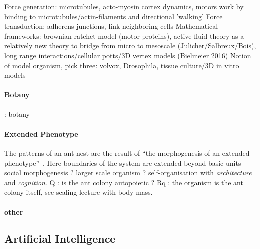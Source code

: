 \documentclass[fleqn,10pt]{wlscirep}
\begin{document}
Force generation: microtubules, acto-myosin cortex dynamics, motors work by binding to microtubules/actin-filaments and directional 'walking'
Force transduction: adherens junctions, link neighboring cells
Mathematical frameworks: brownian ratchet model (motor proteins), active fluid theory as a relatively new theory to bridge from micro to mesoscale (Julicher/Salbreux/Bois), long range interactions/cellular potts/3D vertex models (Bielmeier 2016)
Notion of model organism, pick three: volvox, Drosophila, tissue culture/3D in vitro models 

\paragraph{Botany}

\cite{lord1981cleistogamy} : botany

\paragraph{Extended Phenotype}

The patterns of an ant nest are the result of ``the morphogenesis of an extended phenotype''~\cite{minter2012morphogenesis}. Here boundaries of the system are extended beyond basic units - social morphogenesis ? larger scale organism ? self-organisation with \emph{architecture} and \emph{cognition}. Q : is the ant colony autopoietic ? Rq : the organism is the ant colony itself, see scaling lecture with body mass.


\paragraph{other}

\cite{han2016coordinating}




\subsection*{Artificial Intelligence}

\end{document}

